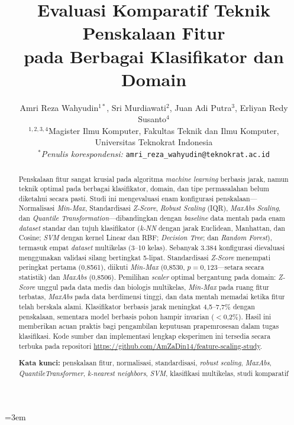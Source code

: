 \documentclass[12pt,a4paper]{article}
\title{\Large\textbf{Evaluasi Komparatif Teknik Penskalaan Fitur\\
       pada Berbagai Klasifikator dan Domain}}
\author{
  Amri Reza Wahyudin$^{1*}$, Sri Murdiawati$^{2}$, Juan Adi Putra$^{3}$, Erliyan Redy Susanto$^{4}$ \\[4pt]
  \normalsize
  $^{1,2,3,4}$Magister Ilmu Komputer, Fakultas Teknik dan Ilmu Komputer,\\
  \normalsize
  Universitas Teknokrat Indonesia \\[4pt]
  \normalsize
  $^{*}$\textit{Penulis korespondensi:} \texttt{amri\_reza\_wahyudin@teknokrat.ac.id}
}
\date{}
\begin{document}
\hfuzz=30pt
\emergencystretch=3em

\maketitle
{}

\begin{abstract}
\noindent
Penskalaan fitur sangat krusial pada algoritma \textit{machine learning} berbasis jarak, namun teknik optimal pada berbagai klasifikator, domain, dan tipe permasalahan belum diketahui secara pasti. Studi ini mengevaluasi enam konfigurasi penskalaan---Normalisasi \textit{Min-Max}, Standardisasi \textit{Z-Score}, \textit{Robust Scaling} (IQR), \textit{MaxAbs Scaling}, dan \textit{Quantile Transformation}---dibandingkan dengan \textit{baseline} data mentah pada enam \textit{dataset} standar dan tujuh klasifikator (\textit{k-NN} dengan jarak Euclidean, Manhattan, dan Cosine; \textit{SVM} dengan kernel Linear dan RBF; \textit{Decision Tree}; dan \textit{Random Forest}), termasuk empat \textit{dataset} multikelas (3--10 kelas). Sebanyak 3.384 konfigurasi dievaluasi menggunakan validasi silang bertingkat 5-lipat. Standardisasi \textit{Z-Score} menempati peringkat pertama (0,8561), diikuti \textit{Min-Max} (0,8530, $p=0,123$---setara secara statistik) dan \textit{MaxAbs} (0,8506). Pemilihan \textit{scaler} optimal bergantung pada domain: \textit{Z-Score} unggul pada data medis dan biologis multikelas, \textit{Min-Max} pada ruang fitur terbatas, \textit{MaxAbs} pada data berdimensi tinggi, dan data mentah memadai ketika fitur telah berskala alami. Klasifikator berbasis jarak meningkat 4,5--7,7\% dengan penskalaan, sementara model berbasis pohon hampir invarian ($<$0,2\%). Hasil ini memberikan acuan praktis bagi pengambilan keputusan prapemrosesan dalam tugas klasifikasi. Kode sumber dan implementasi lengkap eksperimen ini tersedia secara terbuka pada repositori \url{https://github.com/AmZaDin14/feature-scaling-study}.

\vspace{6pt}
\noindent\textbf{Kata kunci:} penskalaan fitur, normalisasi, standardisasi, \textit{robust scaling}, \textit{MaxAbs}, \textit{QuantileTransformer},
\textit{k-nearest neighbors}, \textit{SVM}, klasifikasi multikelas, studi komparatif
\end{abstract}

\end{document}
